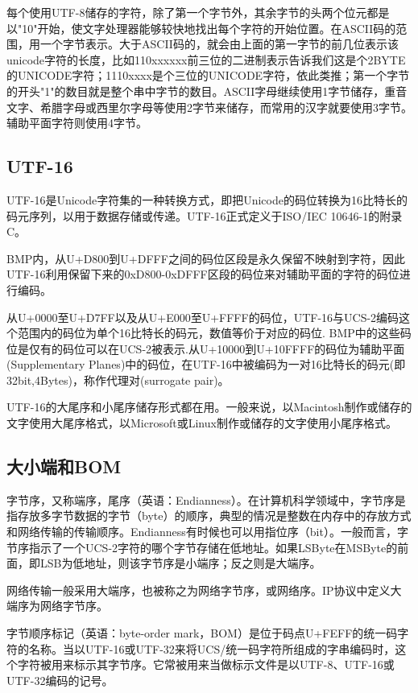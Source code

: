 每个使用UTF-8储存的字符，除了第一个字节外，其余字节的头两个位元都是以"10"开始，使文字处理器能够较快地找出每个字符的开始位置。在ASCII码的范围，用一个字节表示。大于ASCII码的，就会由上面的第一字节的前几位表示该unicode字符的长度，比如110xxxxxx前三位的二进制表示告诉我们这是个2BYTE的UNICODE字符；1110xxxx是个三位的UNICODE字符，依此类推；第一个字节的开头"1"的数目就是整个串中字节的数目。ASCII字母继续使用1字节储存，重音文字、希腊字母或西里尔字母等使用2字节来储存，而常用的汉字就要使用3字节。辅助平面字符则使用4字节。


\subsection{UTF-16}
UTF-16是Unicode字符集的一种转换方式，即把Unicode的码位转换为16比特长的码元序列，以用于数据存储或传递。UTF-16正式定义于ISO/IEC 10646-1的附录C。

BMP内，从U+D800到U+DFFF之间的码位区段是永久保留不映射到字符，因此UTF-16利用保留下来的0xD800-0xDFFF区段的码位来对辅助平面的字符的码位进行编码。

从U+0000至U+D7FF以及从U+E000至U+FFFF的码位，UTF-16与UCS-2编码这个范围内的码位为单个16比特长的码元，数值等价于对应的码位. BMP中的这些码位是仅有的码位可以在UCS-2被表示.从U+10000到U+10FFFF的码位为辅助平面(Supplementary Planes)中的码位，在UTF-16中被编码为一对16比特长的码元(即32bit,4Bytes)，称作代理对(surrogate pair)。

UTF-16的大尾序和小尾序储存形式都在用。一般来说，以Macintosh制作或储存的文字使用大尾序格式，以Microsoft或Linux制作或储存的文字使用小尾序格式。

\subsection{大小端和BOM}

字节序，又称端序，尾序（英语：Endianness）。在计算机科学领域中，字节序是指存放多字节数据的字节（byte）的顺序，典型的情况是整数在内存中的存放方式和网络传输的传输顺序。Endianness有时候也可以用指位序（bit）。一般而言，字节序指示了一个UCS-2字符的哪个字节存储在低地址。如果LSByte在MSByte的前面，即LSB为低地址，则该字节序是小端序；反之则是大端序。

网络传输一般采用大端序，也被称之为网络字节序，或网络序。IP协议中定义大端序为网络字节序。

字节顺序标记（英语：byte-order mark，BOM）是位于码点U+FEFF的统一码字符的名称。当以UTF-16或UTF-32来将UCS/统一码字符所组成的字串编码时，这个字符被用来标示其字节序。它常被用来当做标示文件是以UTF-8、UTF-16或UTF-32编码的记号。

